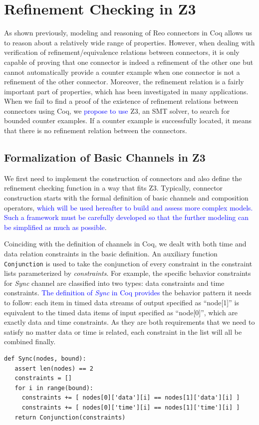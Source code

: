 \documentclass[preprint,3p]{elsarticle}
\newcommand{\liyi}[1]{\textcolor{blue}{#1}}
\newcommand{\xy}[1]{{#1}}
\begin{document}
\section{Refinement Checking in Z3} \label{sec:refinement}
As shown previously, modeling and reasoning of Reo connectors in Coq allows us to reason about a relatively wide range of properties. \xy{However, when dealing with verification of refinement/equivalence relations between connectors, it is only capable of proving that one connector is indeed a refinement of the other one but cannot automatically provide a counter example when one connector is not a refinement of the other connector.} Moreover, the refinement relation is a fairly important part of properties, which has been investigated in many applications. \xy{When we fail to find a proof of the existence of refinement relations between connectors using Coq, we \liyi{propose to use} Z3, an SMT solver,}  to search for bounded counter examples. If a counter example is successfully located, it means that there is no refinement relation between the connectors.

\subsection{Formalization of Basic Channels in Z3}
\label{subsec:basicchannelsinZ3}

We first need to implement the construction of connectors and also define the refinement checking function in a way \xy{that fits Z3.} Typically, connector construction starts with the formal definition of basic channels and composition operators, \liyi{which will be used hereafter to build and assess more complex models. Such a framework must be carefully developed so that the further modeling can be simplified as much as possible}.

Coinciding with the definition of channels in Coq, we dealt with both time and data relation constraints in the basic definition. An auxiliary function \texttt{Conjunction} is used to take the conjunction of every constraint in the constraint lists parameterized by \emph{constraints}.
For example, the specific behavior constraints for \emph{Sync} channel are classified into two types: data constraints and time constraints. \liyi{The definition of \emph{Sync} in Coq provides} the behavior pattern it needs to follow: each item in timed data streams of output specified as ``node[1]'' is equivalent to the timed data items of input specified as ``node[0]'', which are exactly data and time constraints. As they are both requirements that we need to satisfy no matter data or time is related, each constraint in the list will all be combined finally.
\begin{lstlisting}
def Sync(nodes, bound):
   assert len(nodes) == 2
   constraints = []
   for i in range(bound):
     constraints += [ nodes[0]['data'][i] == nodes[1]['data'][i] ]
     constraints += [ nodes[0]['time'][i] == nodes[1]['time'][i] ]
   return Conjunction(constraints)
\end{lstlisting}
\end{document}
